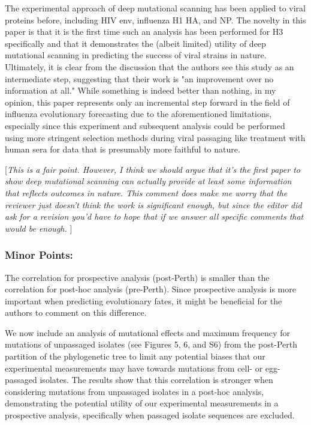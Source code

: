 \documentclass[11pt, oneside]{article}   	%
\newcommand{\comment}[1]{{\color{red}[\textsl{#1}]}}
\newcommand{\response}[1]{{\color{black}#1}}
\begin{document}
The experimental approach of deep mutational scanning has been applied to viral proteins before, including HIV env, influenza H1 HA, and NP. The novelty in this paper is that it is the first time such an analysis has been performed for H3 specifically and that it demonstrates the (albeit limited) utility of deep mutational scanning in predicting the success of viral strains in nature. Ultimately, it is clear from the discussion that the authors see this study as an intermediate step, suggesting that their work is "an improvement over no information at all." While something is indeed better than nothing, in my opinion, this paper represents only an incremental step forward in the field of influenza evolutionary forecasting due to the aforementioned limitations, especially since this experiment and subsequent analysis could be performed using more stringent selection methods during viral passaging like treatment with human sera for data that is presumably more faithful to nature. 

\comment{This is a fair point.
However, I think we should argue that it's the first paper to show deep mutational scanning can actually provide at least some information that reflects outcomes in nature.
This comment does make me worry that the reviewer just doesn't think the work is significant enough, but since the editor did ask for a revision you'd have to hope that if we answer all specific comments that would be enough.
}

\subsubsection*{Minor Points:} 

The correlation for prospective analysis (post-Perth) is smaller than the correlation for post-hoc analysis (pre-Perth). Since prospective analysis is more important when predicting evolutionary fates, it might be beneficial for the authors to comment on this difference. 

\response{We now include an analysis of mutational effects and maximum frequency for mutations of unpassaged isolates (see Figures 5, 6, and S6) from the post-Perth partition of the phylogenetic tree to limit any potential biases that our experimental measurements may have towards mutations from cell- or egg-passaged isolates.
The results show that this correlation is stronger when considering mutations from unpassaged isolates in a post-hoc analysis, demonstrating the potential utility of our experimental measurements in a prospective analysis, specifically when passaged isolate sequences are excluded.
}
\end{document}
